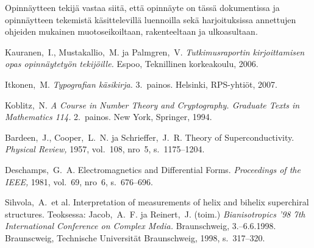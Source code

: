 \documentclass[english,12pt,a4paper,pdftex,sci,utf8]{aaltothesis}
\begin{document}
Opinn\"aytteen tekij\"a vastaa siit\"a, ett\"a opinn\"ayte on t\"ass\"a dokumentissa
ja opinn\"aytteen tekemist\"a k\"asittelevill\"a luennoilla sek\"a
harjoituksissa annettujen ohjeiden mukainen muotoseikoiltaan,
rakenteeltaan ja ulkoasultaan.



\clearpage

{}
\begin{thebibliography}{99}

 Kauranen,\ I., Mustakallio,\ M. ja Palmgren,\ V.
  \textit{Tutkimusraportin kirjoittamisen opas opinn\"aytety\"on
    tekij\"oille.}  Espoo, Teknillinen korkeakoulu, 2006.

 Itkonen,\ M. \textit{Typografian k\"asikirja.} 3.\
  painos.  Helsinki, RPS-yhti\"ot, 2007.

 Koblitz,\ N. \textit{A Course in Number Theory and
    Cryptography. Graduate Texts in Mathematics 114.}  2.\ painos. New
  York, Springer, 1994.

\bibitem{bcs} Bardeen,\ J., Cooper,\ L.\ N. ja Schrieffer,\ J.\ R.
  Theory of Superconductivity. \textit{Physical Review,} 1957, vol.\
  108, nro~5, s.\ 1175--1204.

 Deschamps,\ G.\ A. Electromagnetics and
  Differential Forms. \textit{Proceedings of the IEEE,} 1981, vol.\
  69, nro~6, s.\ 676--696.

\bibitem{Sihvola} Sihvola,\ A.\ et al.
  Interpretation of measurements of helix
    and bihelix superchiral structures.
  Teoksessa: Jacob,\ A.\ F. ja
  Reinert,\ J. (toim.) \textit{Bianisotropics '98 7th International
    Conference on Complex Media.}  Braunschweig, 3.--6.6.1998.
  Braunscweig, Technische Universit\"at Braunschweig, 1998, s.\
  317--320.


\end{thebibliography}
\end{document}
